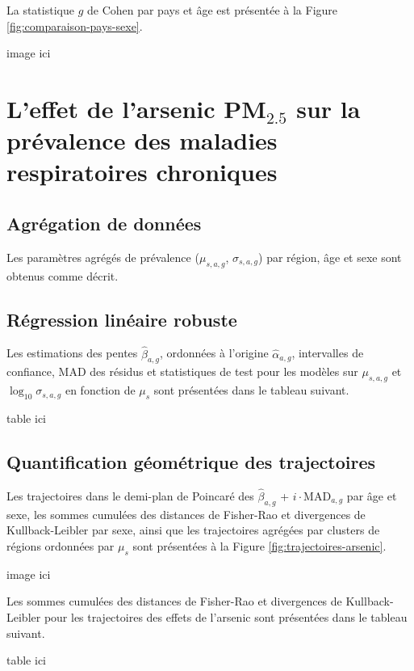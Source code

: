 La statistique $g$ de Cohen par pays et âge est présentée à la Figure \ref{fig:comparaison-pays-sexe}.

image ici

\section{L'effet de l'arsenic PM$_{2.5}$ sur la prévalence des maladies respiratoires chroniques}

\subsection{Agrégation de données}

Les paramètres agrégés de prévalence ($\mu_{s,a,g}$, $\sigma_{s,a,g}$) par région, âge et sexe sont obtenus comme décrit.

\subsection{Régression linéaire robuste}

Les estimations des pentes $\hat{\beta}_{a,g}$, ordonnées à l'origine $\hat{\alpha}_{a,g}$, intervalles de confiance, MAD des résidus et statistiques de test pour les modèles sur $\mu_{s,a,g}$ et $\log_{10} \sigma_{s,a,g}$ en fonction de $\mu_s$ sont présentées dans le tableau suivant.

%
table ici

\subsection{Quantification géométrique des trajectoires}

Les trajectoires dans le demi-plan de Poincaré des $\hat{\beta}_{a,g}$ + $i \cdot \mathrm{MAD}_{a,g}$ par âge et sexe, les sommes cumulées des distances de Fisher-Rao et divergences de Kullback-Leibler par sexe, ainsi que les trajectoires agrégées par clusters de régions ordonnées par $\mu_s$ sont présentées à la Figure \ref{fig:trajectoires-arsenic}.

image ici

Les sommes cumulées des distances de Fisher-Rao et divergences de Kullback-Leibler pour les trajectoires des effets de l'arsenic sont présentées dans le tableau suivant.

%
table ici